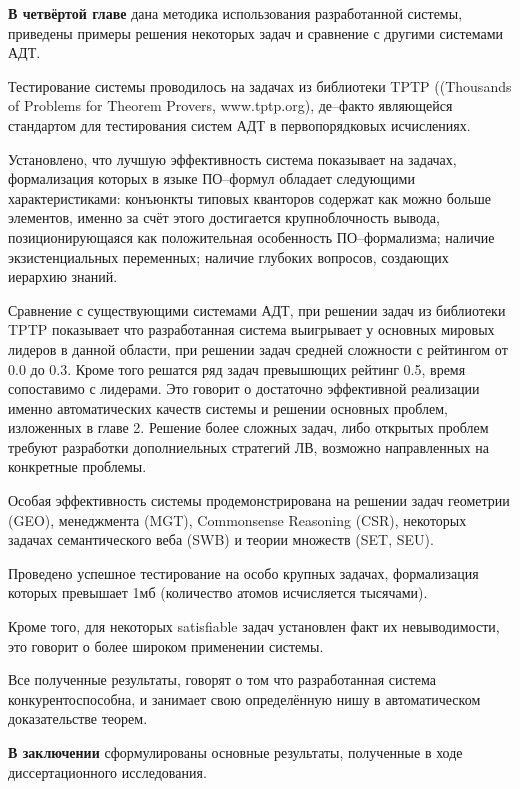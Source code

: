 \documentclass[a4paper]{report}
\begin{document}
\textbf{В четвёртой главе} дана методика использования разработанной системы, приведены примеры решения некоторых задач и сравнение с другими системами АДТ.

Тестирование системы проводилось на задачах из библиотеки TPTP ((Thousands of Problems for Theorem Provers, www.tptp.org), де--факто являющейся стандартом для тестирования систем АДТ в первопорядковых исчислениях.

Установлено, что лучшую эффективность система показывает на задачах, формализация которых в языке ПО--формул обладает следующими характеристиками: конъюнкты типовых кванторов содержат как можно больше элементов, именно за счёт этого достигается крупноблочность вывода, позиционирующаяся как положительная особенность ПО--формализма; наличие экзистенциальных переменных; наличие глубоких вопросов, создающих иерархию знаний.

Сравнение с существующими системами АДТ, при решении задач из библиотеки TPTP показывает что разработанная система выигрывает у основных мировых лидеров в данной области, при решении задач средней сложности с рейтингом от 0.0 до 0.3. Кроме того решатся ряд задач превышющих рейтинг 0.5, время сопоставимо с лидерами. Это говорит о достаточно эффективной реализации именно автоматических качеств системы и решении основных проблем, изложенных в главе 2. Решение более сложных задач, либо открытых проблем требуют разработки дополниельных стратегий ЛВ, возможно направленных на конкретные проблемы.

Особая эффективность системы продемонстрирована на решении задач геометрии (GEO), менеджмента (MGT), Commonsense Reasoning (CSR),  некоторых задачах семантического веба (SWB) и теории множеств (SET, SEU).

Проведено успешное тестирование на особо крупных задачах, формализация которых превышает 1мб (количество атомов исчисляется тысячами).

Кроме того, для некоторых satisfiable задач установлен факт их невыводимости, это говорит о более широком применении системы.

Все полученные результаты, говорят о том что разработанная система конкурентоспособна, и занимает свою определённую нишу в автоматическом доказательстве теорем.

\textbf{В заключении} сформулированы основные результаты, полученные в ходе диссертационного исследования.
\end{document}
